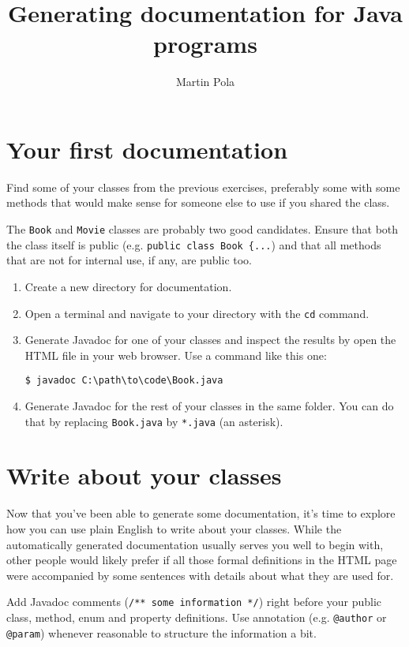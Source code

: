 \documentclass[a4paper, english]{article}
\title{Generating documentation for Java programs}
\author{Martin Pola}
\date{}
\begin{document}
    \maketitle

    \section{Your first documentation}
        Find some of your classes from the previous exercises, preferably some with some methods that would make sense for someone else to use if you shared the class.
        
        The \texttt{Book} and \texttt{Movie} classes are probably two good candidates. Ensure that both the class itself is public (e.g. \texttt{public class Book \{...}) and that all methods that are not for internal use, if any, are public too.

        \begin{enumerate}
            \item Create a new directory for documentation.
            \item Open a terminal and navigate to your directory with the \texttt{cd} command.
            \item Generate Javadoc for one of your classes and inspect the results by open the HTML file in your web browser. Use a command like this one:
            \begin{lstlisting}
$ javadoc C:\path\to\code\Book.java\end{lstlisting}
            \item Generate Javadoc for the rest of your classes in the same folder. You can do that by replacing \texttt{Book.java} by \texttt{*.java} (an asterisk).
        \end{enumerate}

    \section{Write about your classes}
        Now that you've been able to generate some documentation, it's time to explore how you can use plain English to write about your classes. While the automatically generated documentation usually serves you well to begin with, other people would likely prefer if all those formal definitions in the HTML page were accompanied by some sentences with details about what they are used for.

        Add Javadoc comments (\texttt{/** some information */}) right before your public class, method, enum and property definitions. Use annotation (e.g. \texttt{@author} or \texttt{@param}) whenever reasonable to structure the information a bit.
\end{document}
